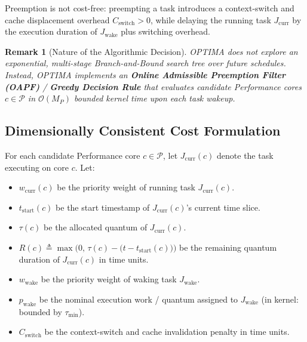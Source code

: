 \documentclass[conference]{IEEEtran}
\newtheorem{remark}{Remark}
\begin{document}
Preemption is not cost-free: preempting a task introduces a context-switch and cache displacement overhead $C_{\mathrm{switch}} > 0$, while delaying the running task $J_{\mathrm{curr}}$ by the execution duration of $J_{\mathrm{wake}}$ plus switching overhead.

\begin{remark}[Nature of the Algorithmic Decision]
OPTIMA does \emph{not} explore an exponential, multi-stage Branch-and-Bound search tree over future schedules. Instead, OPTIMA implements an \textbf{Online Admissible Preemption Filter (OAPF)} / \textbf{Greedy Decision Rule} that evaluates candidate Performance cores $c \in \mathcal{P}$ in $\mathcal{O}(M_P)$ bounded kernel time upon each task wakeup.
\end{remark}

\subsection{Dimensionally Consistent Cost Formulation}
For each candidate Performance core $c \in \mathcal{P}$, let $J_{\mathrm{curr}}(c)$ denote the task executing on core $c$. Let:
\begin{itemize}
    \item $w_{\mathrm{curr}}(c)$ be the priority weight of running task $J_{\mathrm{curr}}(c)$.
    \item $t_{\mathrm{start}}(c)$ be the start timestamp of $J_{\mathrm{curr}}(c)$'s current time slice.
    \item $\tau(c)$ be the allocated quantum of $J_{\mathrm{curr}}(c)$.
    \item $R(c) \triangleq \max\Big(0, \, \tau(c) - \big(t - t_{\mathrm{start}}(c)\big)\Big)$ be the remaining quantum duration of $J_{\mathrm{curr}}(c)$ in time units.
    \item $w_{\mathrm{wake}}$ be the priority weight of waking task $J_{\mathrm{wake}}$.
    \item $p_{\mathrm{wake}}$ be the nominal execution work / quantum assigned to $J_{\mathrm{wake}}$ (in kernel: bounded by $\tau_{\min}$).
    \item $C_{\mathrm{switch}}$ be the context-switch and cache invalidation penalty in time units.
\end{itemize}
\end{document}
